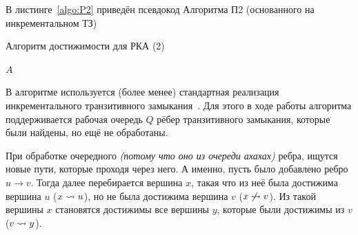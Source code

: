     В листинге~\ref{algo:P2} приведён псевдокод Алгоритма П2 (основанного на инкрементальном ТЗ)

    \begin{algorithm}[H]
        \begin{algorithmic}[1]
        \caption{Алгоритм достижимости для РКА (2)}
        \label{algo:P2}
                \EndFor
            \EndFor
                \EndIf
                            \EndIf
                        \EndFor
                    \EndIf
                \EndFor
            \EndWhile
        \State \Return $A$
        \EndFunction
        \end{algorithmic}
    \end{algorithm}

    В алгоритме используется (более менее) стандартная реализация инкрементального транзитивного замыкания~\cite{Ibaraki1983}. Для этого в ходе работы алгоритма поддерживается рабочая очередь $Q$ рёбер транзитивного замыкания, которые были найдены, но ещё не обработаны. 

    При обработке очередного \textit{(потому что оно из очереди ахахах)} ребра, ищутся новые пути, которые проходя через него. А именно, пусть было добавлено ребро $u \to v$. Тогда далее перебирается вершина $x$, такая что из неё была достижима вершина $u$ ($x \rightsquigarrow u$), но не была достижима вершина $v$ ($x \not\rightsquigarrow v$). Из такой вершины $x$ становятся достижимы все вершины $y$, которые были достижимы из $v$ ($v \rightsquigarrow y$).

